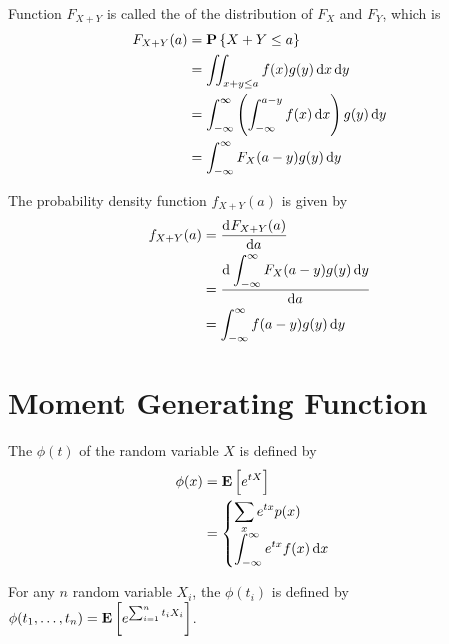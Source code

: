 \begin{definition}
    Function $F_{X+Y}$ is called the  of the distribution of $F_X$ and $F_Y$, which is
    \begin{equation}
        \begin{aligned}
            F_{X+Y}(a) &= \probability{X + Y \leq a} \\
            &= \iint_{x+y \leq a} f(x) g(y) \dif{x} \dif{y} \\
            &= \int_{-\infty}^\infty \left( \int_{-\infty}^{a - y} f(x) \dif{x} \right) g(y) \dif{y} \\
            &= \int_{-\infty}^\infty F_X (a-y)g(y) \dif{y}
        \end{aligned}
    \end{equation}
    
    The probability density function $f_{X+Y}(a)$ is given by 
    \begin{equation}
        \begin{aligned}
            f_{X+Y}(a) &= \dod{F_{X+Y}(a)}{a} \\
            &= \dod{\displaystyle \int_{-\infty}^\infty F_X (a-y)g(y) \dif{y}}{a} \\
            &= \int_{-\infty}^{\infty} f(a-y) g(y) \dif{y}
        \end{aligned}
    \end{equation}
\end{definition}




\section{Moment Generating Function}

\begin{definition}
    The  $\phi(t)$ of the random variable $X$ is defined by
    \begin{equation}
        \begin{aligned}
            \phi(x) &= \expect{e^{tX}} \\
            &= \begin{cases}
                 \displaystyle \sum_x e^{tx} p(x)\\
                 \displaystyle \int_{-\infty}^\infty e^{tx} f(x) \dif{x}
            \end{cases}
        \end{aligned}
    \end{equation}
    
    For any $n$ random variable $X_i$, the  $\phi(t_i)$ is defined by $\phi(t_1, \dots, t_n) = \mathop{\bf E\/}\displaystyle \left[  e^{ \sum_{i=1}^n t_i X_i} \right]$.
\end{definition}

